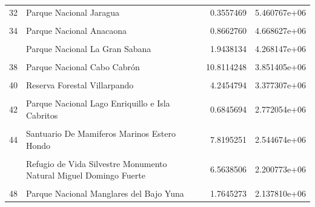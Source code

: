 \documentclass[10pt,landscape,a3paper]{article}
\begin{document}
\begin{longtable}[t]{llrr}
32 & Parque Nacional Jaragua & 0.3557469 & 5.460767e+06\\
\cellcolor{lightgray}{33} & \cellcolor{lightgray}{Monumento Natural Lagunas Cabarete y Goleta} & \cellcolor{lightgray}{7.4869378} & \cellcolor{lightgray}{5.375732e+06}\\
34 & Parque Nacional Anacaona & 0.8662760 & 4.668627e+06\\
\cellcolor{lightgray}{35} & \cellcolor{lightgray}{Reserva Forestal Las Matas} & \cellcolor{lightgray}{8.9687134} & \cellcolor{lightgray}{4.285024e+06}\\
\addlinespace
36 & Parque Nacional La Gran Sabana & 1.9438134 & 4.268147e+06\\
\cellcolor{lightgray}{37} & \cellcolor{lightgray}{Monumento Natural Hoyo Claro} & \cellcolor{lightgray}{10.4508619} & \cellcolor{lightgray}{4.106759e+06}\\
38 & Parque Nacional Cabo Cabrón & 10.8114248 & 3.851405e+06\\
\cellcolor{lightgray}{39} & \cellcolor{lightgray}{Refugio de Vida Silvestre Cañón Río Gurabo} & \cellcolor{lightgray}{11.8174946} & \cellcolor{lightgray}{3.564134e+06}\\
40 & Reserva Forestal Villarpando & 4.2454794 & 3.377307e+06\\
\addlinespace
\cellcolor{lightgray}{41} & \cellcolor{lightgray}{Reserva Forestal Cabeza de Toro} & \cellcolor{lightgray}{0.7569748} & \cellcolor{lightgray}{2.843338e+06}\\
42 & Parque Nacional Lago Enriquillo e Isla Cabritos & 0.6845694 & 2.772054e+06\\
\cellcolor{lightgray}{43} & \cellcolor{lightgray}{Reserva Cientifica Loma Quita Espuela} & \cellcolor{lightgray}{3.4800012} & \cellcolor{lightgray}{2.635633e+06}\\
44 & Santuario De Mamiferos Marinos Estero Hondo & 7.8195251 & 2.544674e+06\\
\cellcolor{lightgray}{45} & \cellcolor{lightgray}{Parque Nacional Saltos de la Jalda} & \cellcolor{lightgray}{6.3589184} & \cellcolor{lightgray}{2.316788e+06}\\
\addlinespace
46 & Refugio de Vida Silvestre Monumento Natural Miguel Domingo Fuerte & 6.5638506 & 2.200773e+06\\
\cellcolor{lightgray}{47} & \cellcolor{lightgray}{Reserva Forestal Loma El 20} & \cellcolor{lightgray}{4.2928178} & \cellcolor{lightgray}{2.147130e+06}\\
48 & Parque Nacional Manglares del Bajo Yuna & 1.7645273 & 2.137810e+06\\

\end{longtable}
\end{document}
